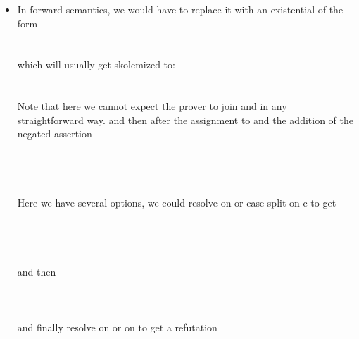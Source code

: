 \begin{itemize}
\begin{itemize}
		\item In forward semantics, we would have to replace it with an existential of the form \\
			  \\
			  \\
			which will usually get skolemized to: \\
			  \\
			  \\
			Note that here we cannot expect the prover to join  and  in any straightforward way.
			and then after the assignment to  and the addition of the negated assertion\\
			  \\
			  \\
			  \\
			 \\
			Here we have several options, we could resolve on  or case split on c to get \\
			  \\
			  \\
			  \\
			 \\
			and then \\
			 \\
			 \\
			 \\
			and finally resolve on  or on  to get a refutation
			

\end{itemize}
\end{itemize}
